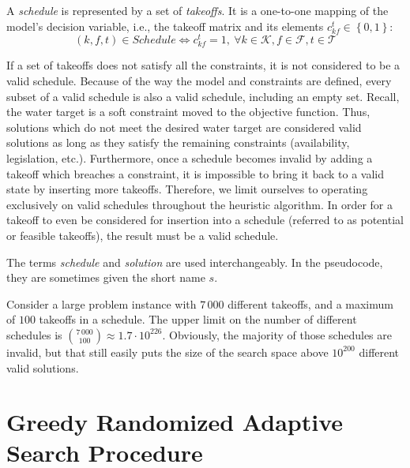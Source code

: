 A \textit{schedule} is represented by a set of \textit{takeoffs}.
It is a one-to-one mapping of the model's decision variable, i.e., the takeoff matrix and its elements \hbox{$c_{kf}^t \in \left\{ 0, 1 \right\}$}:
\begin{equation}
    (k, f, t) \in \mathit{Schedule} \iff c_{kf}^t = 1,\ \forall k \in \mathcal{K}, f \in \mathcal{F}, t \in \mathcal{T}
\end{equation}

If a set of takeoffs does not satisfy all the constraints, it is not considered to be a valid schedule.
Because of the way the model and constraints are defined, every subset of a valid schedule is also a valid schedule, including an empty set.
Recall, the water target is a soft constraint moved to the objective function.
Thus, solutions which do not meet the desired water target are considered valid solutions as long as they satisfy the remaining constraints (availability, legislation, etc.). 
Furthermore, once a schedule becomes invalid by adding a takeoff which breaches a constraint, it is impossible to bring it back to a valid state by inserting more takeoffs.
Therefore, we limit ourselves to operating exclusively on valid schedules throughout the heuristic algorithm.
In order for a takeoff to even be considered for insertion into a schedule (referred to as potential or feasible takeoffs), the result must be a valid schedule.

The terms \textit{schedule} and \textit{solution} are used interchangeably.
In the pseudocode, they are sometimes given the short name $s$.

Consider a large problem instance with $7\,000$ different takeoffs, and a maximum of $100$ takeoffs in a schedule.
The upper limit on the number of different schedules is $\binom{7\,000}{100} \approx 1.7 \cdot 10^{226}$.
Obviously, the majority of those schedules are invalid, but that still easily puts the size of the search space above $10^{200}$ different valid solutions.


\section{Greedy Randomized Adaptive Search Procedure}

